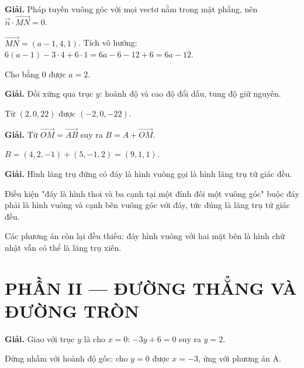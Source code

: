 \documentclass[11pt, a4paper]{article}
\begin{document}
\vspace{0.3cm}
\begin{dapan}[12 — Đáp án D]

\textbf{Giải.} Pháp tuyến vuông góc với mọi vectơ nằm trong mặt phẳng, nên $\vec{n} \cdot \overrightarrow{MN} = 0$.

$\overrightarrow{MN} = (a-1, 4, 1)$. Tích vô hướng: $6(a-1) - 3 \cdot 4 + 6 \cdot 1 = 6a - 6 - 12 + 6 = 6a - 12$.

Cho bằng $0$ được $a = 2$.


\end{dapan}
\vspace{0.3cm}
\begin{dapan}[13 — Đáp án C]

\textbf{Giải.} Đối xứng qua trục $y$: hoành độ và cao độ đổi dấu, tung độ giữ nguyên.

Từ $(2,0,22)$ được $(-2,0,-22)$.


\end{dapan}
\vspace{0.3cm}
\begin{dapan}[14 — Đáp án B]

\textbf{Giải.} Từ $\overrightarrow{OM} = \overrightarrow{AB}$ suy ra $B = A + \overrightarrow{OM}$.

$B = (4,2,-1) + (5,-1,2) = (9,1,1)$.


\end{dapan}
\vspace{0.3cm}
\begin{dapan}[15 — Đáp án C]

\textbf{Giải.} Hình lăng trụ đứng có đáy là hình vuông gọi là hình lăng trụ tứ giác đều.

Điều kiện "đáy là hình thoi và ba cạnh tại một đỉnh đôi một vuông góc" buộc đáy phải là hình vuông và cạnh bên vuông góc với đáy, tức đúng là lăng trụ tứ giác đều.

Các phương án còn lại đều thiếu: đáy hình vuông với hai mặt bên là hình chữ nhật vẫn có thể là lăng trụ xiên.

\section{PHẦN II — ĐƯỜNG THẲNG VÀ ĐƯỜNG TRÒN}


\end{dapan}
\vspace{0.3cm}
\begin{dapan}[16 — Đáp án C]

\textbf{Giải.} Giao với trục $y$ là cho $x = 0$: $-3y + 6 = 0$ suy ra $y = 2$.

Đừng nhầm với hoành độ gốc: cho $y = 0$ được $x = -3$, ứng với phương án A.


\end{dapan}
\end{document}
